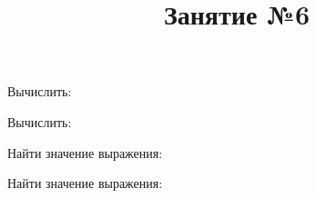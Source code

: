 \begin{listofex}
	\item {}
	\item Вычислить:
	\begin{enumcols}[itemcolumns=2]
		\item {}
		\item {}
		\item {}
		\item {}
		\item {}
	\end{enumcols}
	\item Вычислить:
	\begin{enumcols}[itemcolumns=2]
		\item {}
		\item {}
	\end{enumcols}
	\item Найти значение выражения:
	\begin{enumcols}[itemcolumns=2]
		\item {}
		\item {}
	\end{enumcols}
	\item {}
	\item Найти значение выражения:
	\begin{enumcols}[itemcolumns=2]
		\item {}
		\item {}
	\end{enumcols}
\end{listofex}
\newpage
\title{Занятие №6}

